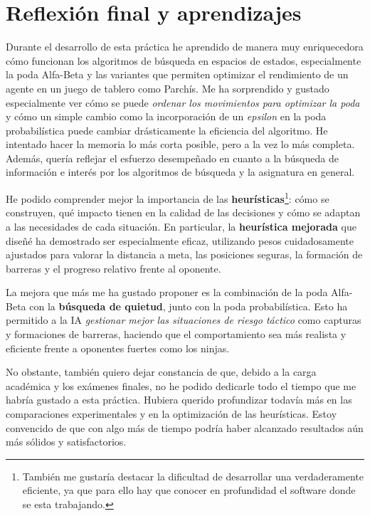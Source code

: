 \chapter*{Reflexión final y aprendizajes}

Durante el desarrollo de esta práctica he aprendido de manera muy enriquecedora cómo funcionan los algoritmos de búsqueda en espacios de estados, especialmente la poda Alfa-Beta y las variantes que permiten optimizar el rendimiento de un agente en un juego de tablero como Parchís. Me ha sorprendido y gustado especialmente ver cómo se puede \textit{ordenar los movimientos para optimizar la poda} y cómo un simple cambio como la incorporación de un \textit{epsilon} en la poda probabilística puede cambiar drásticamente la eficiencia del algoritmo. He intentado hacer la memoria lo más corta posible, pero a la vez lo más completa. Además, quería reflejar el esfuerzo desempeñado en cuanto a la búsqueda de información e interés por los algoritmos de búsqueda y la asignatura en general.

He podido comprender mejor la importancia de las \textbf{heurísticas}\footnote{También me gustaría destacar la dificultad de desarrollar una verdaderamente eficiente, ya que para ello hay que conocer en profundidad el software donde se esta trabajando.}: cómo se construyen, qué impacto tienen en la calidad de las decisiones y cómo se adaptan a las necesidades de cada situación. En particular, la \textbf{heurística mejorada} que diseñé ha demostrado ser especialmente eficaz, utilizando pesos cuidadosamente ajustados para valorar la distancia a meta, las posiciones seguras, la formación de barreras y el progreso relativo frente al oponente.

La mejora que más me ha gustado proponer es la combinación de la poda Alfa-Beta con la \textbf{búsqueda de quietud}, junto con la poda probabilística. Esto ha permitido a la IA \textit{gestionar mejor las situaciones de riesgo táctico} como capturas y formaciones de barreras, haciendo que el comportamiento sea más realista y eficiente frente a oponentes fuertes como los ninjas.

No obstante, también quiero dejar constancia de que, debido a la carga académica y los exámenes finales, no he podido dedicarle todo el tiempo que me habría gustado a esta práctica. Hubiera querido profundizar todavía más en las comparaciones experimentales y en la optimización de las heurísticas. Estoy convencido de que con algo más de tiempo podría haber alcanzado resultados aún más sólidos y satisfactorios.

